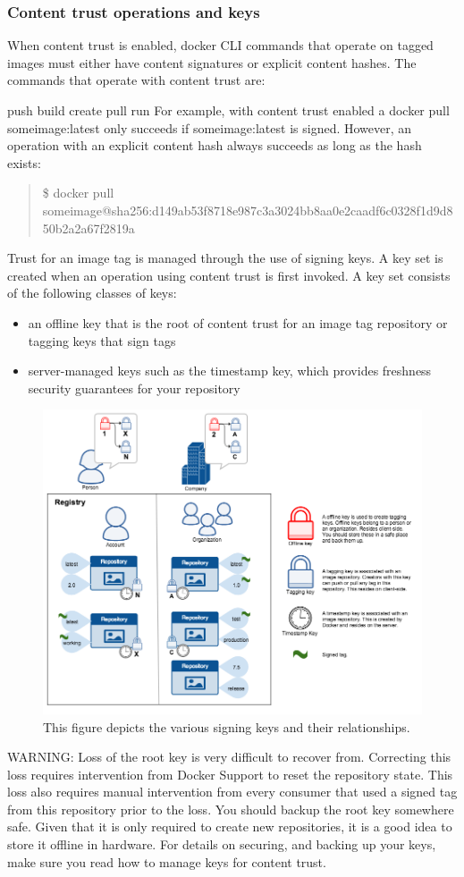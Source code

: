 \subsubsection{Content trust operations and keys}
When content trust is enabled, docker CLI commands that operate on tagged
images must either have content signatures or explicit content hashes. The
commands that operate with content trust are:

push
build
create
pull
run
For example, with content trust enabled a docker pull someimage:latest only
succeeds if someimage:latest is signed. However, an operation with an
explicit content hash always succeeds as long as the hash exists:

\begin{quote}
\$ docker pull
someimage@sha256:d149ab53f8718e987c3a3024bb8aa0e2caadf6c0328f1d9d850b2a2a67f2819a
\end{quote}

Trust for an image tag is managed through the use of signing keys. A key
set is created when an operation using content trust is first invoked. A
key set consists of the following classes of keys:

\begin{itemize}
\item an offline key that is the root of content trust for an image tag
repository or tagging keys that sign tags
\item server-managed keys such as the timestamp key, which provides freshness
security guarantees for your repository
\end{itemize}

\begin{figure}[t]
  \center{}
  \includegraphics[width=.5\textwidth]{images/notary_trust_components.png}
  \caption{
This figure depicts the various signing keys and their
relationships.
  \label{fig-notary-components} }
\end{figure}

WARNING: Loss of the root key is very difficult to recover from. Correcting
this loss requires intervention from Docker Support to reset the repository
state. This loss also requires manual intervention from every consumer that
used a signed tag from this repository prior to the loss.
You should backup the root key somewhere safe. Given that it is only
required to create new repositories, it is a good idea to store it offline
in hardware. For details on securing, and backing up your keys, make sure
you read how to manage keys for content trust.

